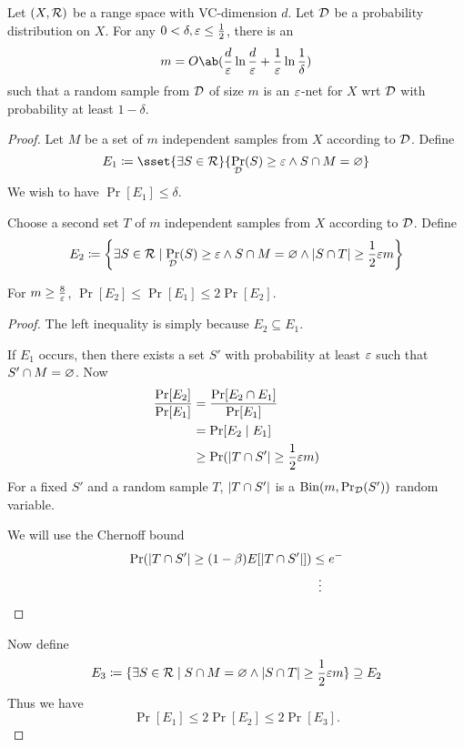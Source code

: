 \begin{theorem*} \label{thm:eps-nets}
    Let $(X, \mathcal{R})$ be a range space with VC-dimension $d$.
    Let $\mathcal{D}$ be a probability distribution on $X$.
    For any $0 < \delta, \varepsilon \le \frac12$,
    there is an \[
        m = O\ab(\frac{d}{\eps} \ln \frac{d}{\eps} + \frac1{\eps} \ln \frac1{\delta})
    \] such that a random sample from $\mathcal{D}$ of size $m$ is an $\varepsilon$-net
    for $X$ wrt $\mathcal{D}$ with probability at least $1 - \delta$.
\end{theorem*}
\begin{proof}
    Let $M$ be a set of $m$ independent samples from $X$ according to
    $\mathcal{D}$.
    Define \[
        E_1 \coloneq \sset{\exists S \in \mcR}{\Pr_\mcD(S) \ge \eps
                    \land S \cap M = \O}
    \] We wish to have $\Pr[E_1] \le \delta$.

    Choose a second set $T$ of $m$ independent samples from $X$ according to
    $\mathcal{D}$.
    Define \[
        E_2 \coloneq \set*{\exists S \in \mcR \mid \Pr_\mcD(S) \ge \eps
            \land S \cap M = \O \land \abs{S \cap T} \ge \frac12 \eps m}
    \]
    \begin{lemma}
        For $m \ge \frac{8}{\varepsilon}$, $\Pr[E_2] \le \Pr[E_1] \le 2 \Pr[E_2]$.
    \end{lemma}
    \begin{proof}
        The left inequality is simply because $E_2 \subseteq E_1$.

        If $E_1$ occurs, then there exists a set $S'$ with probability
        at least $\varepsilon$ such that $S' \cap M = \varnothing$.
        Now \begin{align*}
            \frac{\Pr[E_2]}{\Pr[E_1]} &= \frac{\Pr[E_2 \cap E_1]}{\Pr[E_1]} \\
            &= \Pr[E_2 \mid E_1] \\
            &\ge \Pr(\lvert T \cap S'\rvert \ge \frac12 \varepsilon m)
        \end{align*}
        For a fixed $S'$ and a random sample $T$, $\lvert T \cap S'\rvert$ is
        a $\operatorname{Bin}(m, \Pr_{\mathcal{D}}(S'))$ random variable.

        We will use the Chernoff bound
        \begin{align*}
            \Pr(\abs{T \cap S'} \ge (1 - \beta) E[\abs{T \cap S'}])
            &\le e^{-} \\
            &\vdotswithin{\le}
        \end{align*}
    \end{proof}
    Now define \[
        E_3 \coloneq \{\exists S \in \mathcal{R} \mid
            S \cap M = \varnothing \land \lvert S \cap T\rvert \ge \frac12 \varepsilon m\}
            \supseteq E_2
    \] Thus we have \[
        \Pr[E_1] \le 2 \Pr[E_2] \le 2 \Pr[E_3].
    \]


\end{proof}
